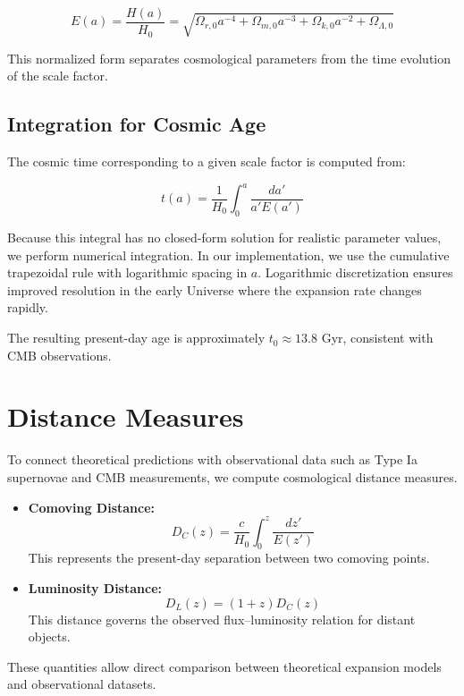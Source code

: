 \documentclass[12pt, a4paper]{article}
\begin{document}
\begin{equation}
E(a) = \frac{H(a)}{H_0} = \sqrt{\Omega_{r,0}a^{-4} + \Omega_{m,0}a^{-3} + \Omega_{k,0}a^{-2} + \Omega_{\Lambda,0}}
\end{equation}

This normalized form separates cosmological parameters from the time evolution of the scale factor.

\subsection{Integration for Cosmic Age}

The cosmic time corresponding to a given scale factor is computed from:

\begin{equation}
t(a) = \frac{1}{H_0} \int_{0}^{a} \frac{da'}{a' E(a')}
\end{equation}

Because this integral has no closed-form solution for realistic parameter values, we perform numerical integration. In our implementation, we use the cumulative trapezoidal rule with logarithmic spacing in $a$. Logarithmic discretization ensures improved resolution in the early Universe where the expansion rate changes rapidly.

The resulting present-day age is approximately $t_0 \approx 13.8$ Gyr, consistent with CMB observations.


\section{Distance Measures}

To connect theoretical predictions with observational data such as Type Ia supernovae and CMB measurements, we compute cosmological distance measures.

\begin{itemize}
    \item \textbf{Comoving Distance:} 
    \[
    D_C(z) = \frac{c}{H_0} \int_0^z \frac{dz'}{E(z')}
    \]
    This represents the present-day separation between two comoving points.
    
    \item \textbf{Luminosity Distance:}
    \[
    D_L(z) = (1+z) D_C(z)
    \]
    This distance governs the observed flux–luminosity relation for distant objects.
\end{itemize}

These quantities allow direct comparison between theoretical expansion models and observational datasets.
\end{document}
